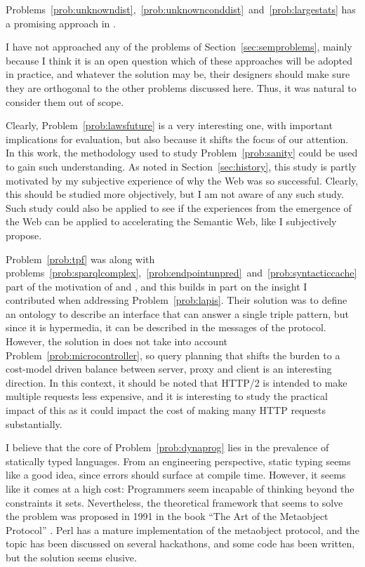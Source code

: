 Problems~\ref{prob:unknowndist},~\ref{prob:unknownconddist}~and~\ref{prob:largestats}
has a promising approach in \cite{5767868}.

I have not approached any of the problems of
Section~\ref{sec:semproblems}, mainly because I think it is an open
question which of these approaches will be adopted in practice, and
whatever the solution may be, their designers should make sure they
are orthogonal to the other problems discussed here. Thus, it was
natural to consider them out of scope. 

Clearly, Problem~\ref{prob:lawsfuture} is a very interesting one, with
important implications for evaluation, but also because it shifts the
focus of our attention. In this work, the methodology used to study
Problem~\ref{prob:sanity} could be used to gain such understanding. As
noted in Section~\ref{sec:history}, this study is partly motivated by
my subjective experience of why the Web was so successful. Clearly,
this should be studied more objectively, but I am not aware of any
such study. Such study could also be applied to see if the experiences
from the emergence of the Web can be applied to accelerating the
Semantic Web, like I subjectively propose.

Problem~\ref{prob:tpf} was along with
problems~\ref{prob:sparqlcomplex},~\ref{prob:endpointunpred}~and~\ref{prob:syntacticcache}
part of the motivation of \cite{ldf1} and \cite{verborgh2014querying},
and this builds in part on the insight I contributed when addressing
Problem~\ref{prob:lapis}. Their solution was to define an ontology to
describe an interface that can answer a single triple pattern, but
since it is hypermedia, it can be described in the messages of the
protocol. However, the solution in \cite{verborgh2014querying} does
not take into account Problem~\ref{prob:microcontroller}, so query
planning that shifts the burden to a cost-model driven balance between
server, proxy and client is an interesting direction. In this context,
it should be noted that HTTP/2 \cite{rfc7540} is intended to make
multiple requests less expensive, and it is interesting to study the
practical impact of this as it could impact the cost of making many
HTTP requests substantially.

I believe that the core of Problem~\ref{prob:dynaprog} lies in the
prevalence of statically typed languages. From an engineering
perspective, static typing seems like a good idea, since errors should
surface at compile time. However, it seems like it comes at a high
cost: Programmers seem incapable of thinking beyond the constraints it
sets. Nevertheless, the theoretical framework that seems to solve the
problem was proposed in 1991 in the book ``The Art of the Metaobject
Protocol'' \cite{kiczales1991art}. Perl has a mature implementation of
the metaobject protocol, and the topic has been discussed on several
hackathons, and some code has been written, but the solution seems
elusive.

